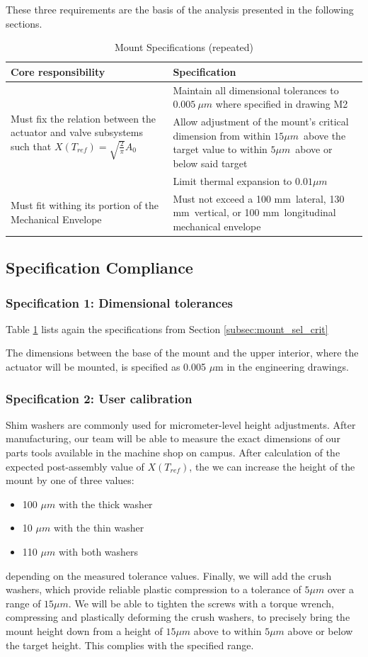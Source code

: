 \documentclass[12pt, letterpaper]{report}%
\newcounter{mycounter}           %
\newcounter{sub}[mycounter]      %
\newcommand{\mountdLTol}{$0.01 \mu m$}
\newcommand{\calRange}{$15 \mu m$}
\newcommand{\calTol}{$5 \mu m$}
\newcommand{\mountMEX}{100 mm}
\newcommand{\mountMEY}{130 mm}
\newcommand{\mountMEZ}{100 mm}
\newcommand{\mountSpecs}
{%
    \begin{tabular}{|m{0.45\textwidth}|m{0.5\textwidth}|}
    
        \hline
        \textbf{Core responsibility} & \textbf{Specification} \\ \hline

        \multirow[c]{3}{0.45\textwidth}{Must fix the relation between the actuator and valve subsystems such that $X(T_{ref}) = \sqrt{\frac{2}{\pi}} A_0$}
        &
        Maintain all dimensional tolerances to $0.005\ \mu m$ where specified in drawing M2
        \\ \cline{2-2}
        &
        Allow adjustment of the mount's critical dimension from within \calRange\ above the target value to within \calTol\ above or below said target
        \\ \cline{2-2}
        &
        Limit thermal expansion to \mountdLTol \\ \hline

        Must fit withing its portion of the Mechanical Envelope
        &
        Must not exceed a \mountMEX\ lateral, \mountMEY\ vertical, or \mountMEZ\ longitudinal mechanical envelope \\
        \hline

    \end{tabular}
}
\begin{document}
            These three requirements are the basis of the analysis presented in the following sections.

        

        \begin{table}[H]
            \centering
            \caption{Mount Specifications (repeated)}
            \mountSpecs
            \label{tab:mount_specs_disc}
            \renewcommand{\arraystretch}{1.4}
        \end{table}
        \subsection{Specification Compliance}
        \subsubsection{Specification 1: Dimensional tolerances}
        \label{subsec:mount_spec_1}

        Table \ref{tab:mount_specs_disc} lists again the specifications from Section \ref{subsec:mount_sel_crit}

            The dimensions between the base of the mount and the upper interior, where the actuator will be mounted, is specified as 0.005 $\mu$m in the engineering drawings.

        \subsubsection{Specification 2: User calibration}
        \label{subsec:mount_spec_2}

            Shim washers are commonly used for micrometer-level height adjustments. After manufacturing, our team will be able to measure the exact dimensions of our parts tools available in the machine shop on campus.
            After calculation of the expected post-assembly value of $X(T_{ref})$, the we can increase the height of the mount by one of three values:

            \begin{itemize}
                \item 100 $\mu m$ with the thick washer
                \item 10 $\mu m$ with the thin washer
                \item 110 $\mu m$ with both washers
            \end{itemize}

            depending on the measured tolerance values. Finally, we will add the crush washers, which provide reliable plastic compression to a tolerance of $5 \mu m$ over a range of $15 \mu m$.
            We will be able to tighten the screws with a torque wrench, compressing and plastically deforming the crush washers, to precisely bring the mount height down from a height of $15 \mu m$ above to within $5 \mu m$ above or below the target height. This complies with the specified range. 
\end{document}
